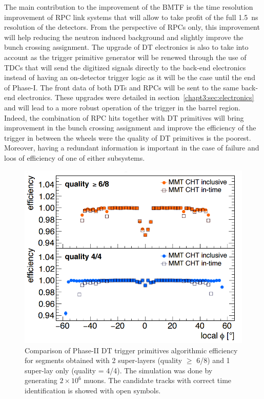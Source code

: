 	The main contribution to the improvement of the BMTF is the time resolution improvement of RPC link systems that will allow to take profit of the full \SI{1.5}{ns} resolution of the detectors. From the perspective of RPCs only, this improvement will help reducing the neutron induced background and slightly improve the bunch crossing assignment. The upgrade of DT electronics is also to take into account as the trigger primitive generator will be renewed through the use of TDCs that will send the digitized signals directly to the back-end electronics instead of having an on-detector trigger logic as it will be the case until the end of Phase-I. The front data of both DTs and RPCs will be sent to the same back-end electronics. These upgrades were detailed in section~\ref{chapt3:sec:electronics} and will lead to a more robust operation of the trigger in the barrel region. Indeed, the combination of RPC hits together with DT primitives will bring improvement in the bunch crossing assignment and improve the efficiency of the trigger in between the wheels were the quality of DT primitives is the poorest. Moreover, having a redundant information is important in the case of failure and loos of efficiency of one of either subsystems.

	\begin{figure}[H]
		\centering
		\includegraphics[width=0.7\plotwidth]{fig/chapt3/DT-efficiency-algo.png}
		\caption{\label{fig:DT-P2-eff} Comparison of Phase-II DT trigger primitives algorithmic efficiency for segments obtained with 2 super-layers (quality $\geq$ 6/8) and 1 super-lay only (quality = 4/4). The simulation was done by generating $2 \times 10^6$ muons. The candidate tracks with correct time identification is showed with open symbols.}
	\end{figure}
	
